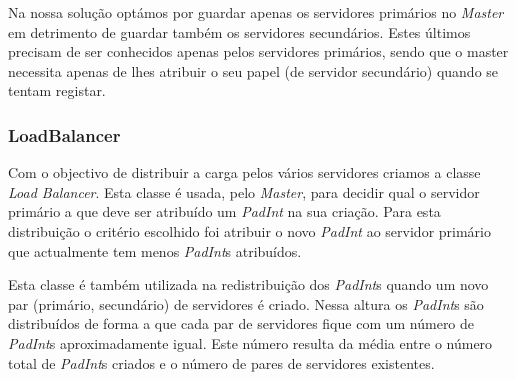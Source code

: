 Na nossa solução optámos por guardar apenas os servidores primários no \textit{Master} em detrimento de guardar também os servidores secundários. Estes últimos precisam de ser conhecidos apenas pelos servidores primários, sendo que o master necessita apenas de lhes atribuir o seu papel (de servidor secundário) quando se tentam registar.

\subsubsection{LoadBalancer}
Com o objectivo de distribuir a carga pelos vários servidores criamos a classe \textit{Load Balancer}. Esta classe é usada, pelo \textit{Master}, para decidir qual o servidor primário a que deve ser atribuído um \textit{PadInt} na sua criação. Para esta distribuição o critério escolhido foi atribuir o novo \textit{PadInt} ao servidor primário que actualmente tem menos \textit{PadInt}s atribuídos.

Esta classe é também utilizada na redistribuição dos \textit{PadInt}s quando um novo par (primário, secundário) de servidores é criado. Nessa altura os \textit{PadInt}s são distribuídos de forma a que cada par de servidores fique com um número de \textit{PadInt}s aproximadamente igual. Este número resulta da média entre o número total de \textit{PadInt}s criados e o número de pares de servidores existentes.
